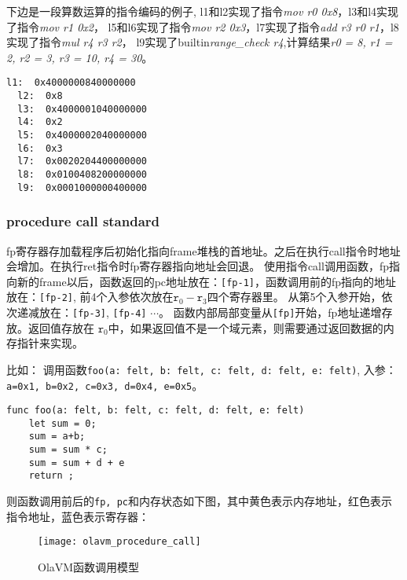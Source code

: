 下边是一段算数运算的指令编码的例子, l1和l2实现了指令\textit{mov r0 0x8}，l3和l4实现了指令\textit{mov r1 0x2}，
l5和l6实现了指令\textit{mov r2 0x3}，l7实现了指令\textit{add r3 r0 r1}，l8实现了指令\textit{mul r4 r3 r2}，
l9实现了builtin\textit{range\_check r4},计算结果\textit{r0 = 8, r1 = 2, r2 = 3, r3 = 10, r4 = 30}。
\begin{lstlisting}[label={lst:inst-decode}]
  l1:  0x4000000840000000
  l2:  0x8
  l3:  0x4000001040000000
  l4:  0x2
  l5:  0x4000002040000000
  l6:  0x3
  l7:  0x0020204400000000
  l8:  0x0100408200000000
  l9:  0x0001000000400000
\end{lstlisting}

\subsubsection{procedure call standard}\label{subsec: processor-instructions-executor-abi}

fp寄存器存加载程序后初始化指向frame堆栈的首地址。之后在执行call指令时地址会增加。在执行ret指令时fp寄存器指向地址会回退。
使用指令call调用函数，fp指向新的frame以后，函数返回的pc地址放在：\texttt{[fp-1]}，函数调用前的fp指向的地址放在：\texttt{[fp-2]}, 前4个入参依次放在$\texttt{r}_0 - \texttt{r}_{3}$四个寄存器里。
从第5个入参开始，依次递减放在：\texttt{[fp-3]}, \texttt{[fp-4]} $\cdots$。
函数内部局部变量从\texttt{[fp]}开始，fp地址递增存放。返回值存放在 $\texttt{r}_0$中，如果返回值不是一个域元素，则需要通过返回数据的内存指针来实现。

比如： 调用函数\texttt{foo(a: felt, b: felt, c: felt, d: felt, e: felt)}, 入参：\texttt{a=0x1, b=0x2, c=0x3, d=0x4, e=0x5}。
\begin{lstlisting}[label={lst:function_call}]
func foo(a: felt, b: felt, c: felt, d: felt, e: felt)
    let sum = 0;
    sum = a+b;
    sum = sum * c;
    sum = sum + d + e
    return ;
\end{lstlisting}

则函数调用前后的\texttt{fp, pc}和内存状态如下图，其中黄色表示内存地址，红色表示指令地址，蓝色表示寄存器：
\begin{figure}[!htp]
    \centering
    \texttt{[image: olavm\_procedure\_call]}
    \caption{OlaVM函数调用模型}
    \label{fig:processor call}
\end{figure}


